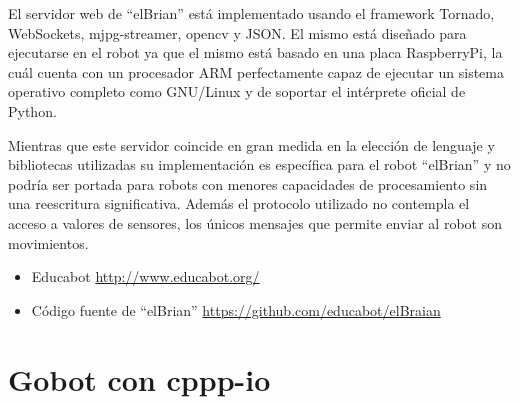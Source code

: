 El servidor web de ``elBrian'' está implementado usando el framework Tornado,
WebSockets, mjpg-streamer, opencv y JSON. El mismo está diseñado para ejecutarse
en el robot ya que el mismo está basado en una placa RaspberryPi, la cuál
cuenta con un procesador ARM perfectamente capaz de ejecutar un sistema
operativo completo como GNU/Linux y de soportar el intérprete oficial de Python.

Mientras que este servidor coincide en gran medida en la elección de lenguaje
y bibliotecas utilizadas su implementación es específica para el robot ``elBrian''
y no podría ser portada para robots con menores capacidades de procesamiento
sin una reescritura significativa. Además el protocolo utilizado no contempla
el acceso a valores de sensores, los únicos mensajes que permite enviar
al robot son movimientos.

\begin{itemize}
    \item Educabot \url{http://www.educabot.org/}
    \item Código fuente de ``elBrian'' \url{https://github.com/educabot/elBraian}
\end{itemize}

\section{Gobot con cppp-io}

